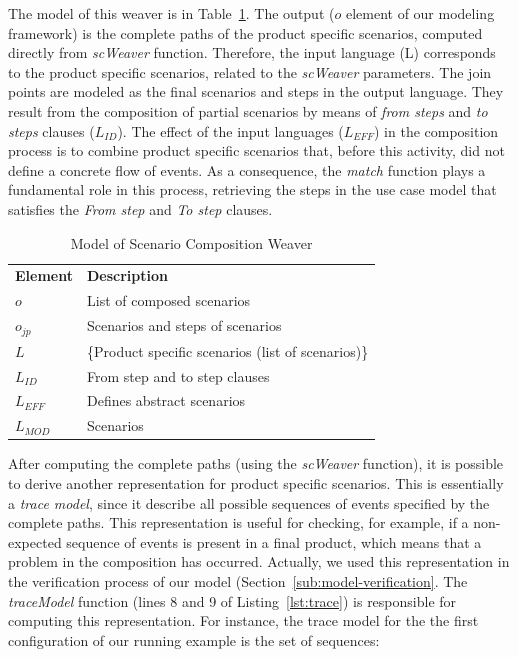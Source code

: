 \documentclass{acm_proc_article-sp}
\begin{document}
The model of this weaver is in Table~\ref{tab:sc-weaver}. The output ($o$ element of our modeling framework) is the complete paths of the product specific scenarios, computed directly from \emph{scWeaver} function. Therefore, the input language (L) corresponds to the product specific scenarios, related to the \emph{scWeaver} 
 parameters. 
The join points are modeled as the final scenarios and steps in the output language. They result from the composition of partial scenarios by means of 
\emph{from steps} and \emph{to steps} clauses ($L_{ID}$).  
The effect of the input languages ($L_{EFF}$) in the composition process is to combine 
product specific scenarios that, before this activity, did not define a concrete flow of events. As a consequence, the \emph{match} function 
plays a fundamental role in this process, retrieving the steps in the use case model that satisfies the \emph{From step} and \emph{To step} clauses.  

\begin{table}[hbt]
\begin{center}
\caption{Model of Scenario Composition Weaver} \label{tab:sc-weaver}
\begin{tabular}{p{0.4in}p{2.6in}}
   \hline\noalign{\smallskip}
  {\bf Element} & {\bf Description} \\
   \noalign{\smallskip}
   \hline
   \noalign{\smallskip}
   $o$               & List of composed scenarios  \\ 
   $o_{jp}$        & Scenarios and steps of scenarios \\ 
   $L$               & \{Product specific scenarios (list of scenarios)\} \\ 
   $L_{ID}$       & From step and to step clauses \\ 
   $L_{EFF}$    & Defines abstract scenarios  \\ 
   $L_{MOD}$  &  Scenarios \\  
  \hline
  \end{tabular}
\end{center}
\end{table}


After computing the complete paths (using the \emph{scWeaver} function), it is possible to derive another representation for product specific scenarios. This is essentially a \emph{trace model}, since it describe all possible sequences of events specified by the complete paths. This representation is useful for checking, for example, if a non-expected sequence of events is present in a final product, which means that a problem in the composition has occurred. Actually, we used this representation in the verification process of our model (Section~\ref{sub:model-verification}. The \emph{traceModel} function (lines 8 and 9 of Listing~\ref{lst:trace}) is responsible for computing this representation. For instance, the trace model for the the first configuration of our running example is the set of sequences:
\end{document}

